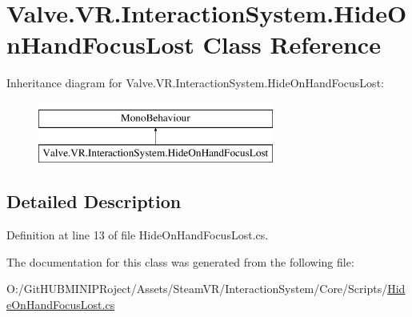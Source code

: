 \hypertarget{class_valve_1_1_v_r_1_1_interaction_system_1_1_hide_on_hand_focus_lost}{}\section{Valve.\+V\+R.\+Interaction\+System.\+Hide\+On\+Hand\+Focus\+Lost Class Reference}
\label{class_valve_1_1_v_r_1_1_interaction_system_1_1_hide_on_hand_focus_lost}
Inheritance diagram for Valve.\+V\+R.\+Interaction\+System.\+Hide\+On\+Hand\+Focus\+Lost\+:\begin{figure}[H]
\begin{center}
\leavevmode
\includegraphics[height=2.000000cm]{class_valve_1_1_v_r_1_1_interaction_system_1_1_hide_on_hand_focus_lost}
\end{center}
\end{figure}


\subsection{Detailed Description}


Definition at line 13 of file Hide\+On\+Hand\+Focus\+Lost.\+cs.



The documentation for this class was generated from the following file\+:\begin{DoxyCompactItemize}
\item 
O\+:/\+Git\+H\+U\+B\+M\+I\+N\+I\+P\+Roject/\+Assets/\+Steam\+V\+R/\+Interaction\+System/\+Core/\+Scripts/\mbox{\hyperlink{_hide_on_hand_focus_lost_8cs}{Hide\+On\+Hand\+Focus\+Lost.\+cs}}\end{DoxyCompactItemize}
